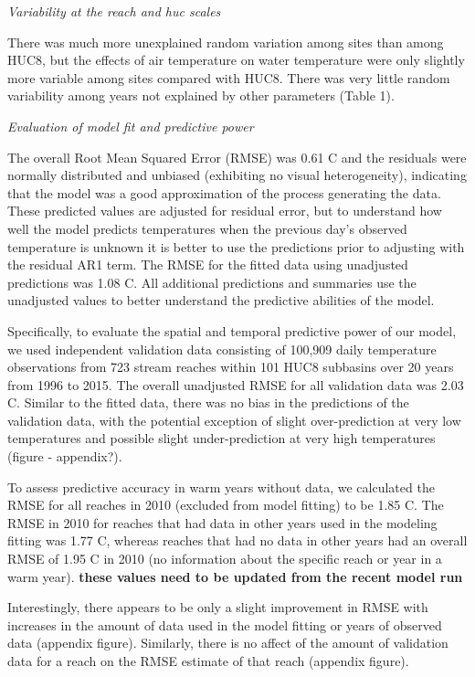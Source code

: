 \emph{Variability at the reach and huc scales}

There was much more unexplained random variation among sites than among
HUC8, but the effects of air temperature on water temperature were only
slightly more variable among sites compared with HUC8. There was very
little random variability among years not explained by other parameters
(Table 1).

\emph{Evaluation of model fit and predictive power}

The overall Root Mean Squared Error (RMSE) was 0.61 C and the residuals
were normally distributed and unbiased (exhibiting no visual
heterogeneity), indicating that the model was a good approximation of
the process generating the data. These predicted values are adjusted for
residual error, but to understand how well the model predicts
temperatures when the previous day's observed temperature is unknown it
is better to use the predictions prior to adjusting with the residual
AR1 term. The RMSE for the fitted data using unadjusted predictions was
1.08 C. All additional predictions and summaries use the unadjusted
values to better understand the predictive abilities of the model.

Specifically, to evaluate the spatial and temporal predictive power of
our model, we used independent validation data consisting of 100,909
daily temperature observations from 723 stream reaches within 101 HUC8
subbasins over 20 years from 1996 to 2015. The overall unadjusted RMSE
for all validation data was 2.03 C. Similar to the fitted data, there
was no bias in the predictions of the validation data, with the
potential exception of slight over-prediction at very low temperatures
and possible slight under-prediction at very high temperatures (figure -
appendix?).

To assess predictive accuracy in warm years without data, we calculated
the RMSE for all reaches in 2010 (excluded from model fitting) to be
1.85 C. The RMSE in 2010 for reaches that had data in other years used
in the modeling fitting was 1.77 C, whereas reaches that had no data in
other years had an overall RMSE of 1.95 C in 2010 (no information about
the specific reach or year in a warm year). \textbf{these values need to
be updated from the recent model run}

Interestingly, there appears to be only a slight improvement in RMSE
with increases in the amount of data used in the model fitting or years
of observed data (appendix figure). Similarly, there is no affect of the
amount of validation data for a reach on the RMSE estimate of that reach
(appendix figure).

